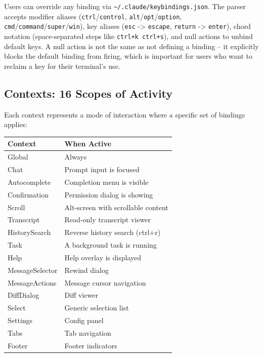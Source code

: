 \documentclass[
  english,
  11pt,
  letterpaper,
]{book}
\begin{document}
Users can override any binding via
\texttt{\textasciitilde{}/.claude/keybindings.json}. The parser accepts
modifier aliases (\texttt{ctrl}/\texttt{control},
\texttt{alt}/\texttt{opt}/\texttt{option},
\texttt{cmd}/\texttt{command}/\texttt{super}/\texttt{win}), key aliases
(\texttt{esc} -\textgreater{} \texttt{escape}, \texttt{return}
-\textgreater{} \texttt{enter}), chord notation (space-separated steps
like \texttt{ctrl+k\ ctrl+s}), and null actions to unbind default keys.
A null action is not the same as not defining a binding -- it explicitly
blocks the default binding from firing, which is important for users who
want to reclaim a key for their terminal's use.

\subsection{Contexts: 16 Scopes of
Activity}\label{contexts-16-scopes-of-activity}

Each context represents a mode of interaction where a specific set of
bindings applies:

\begin{longtable}[]{@{}ll@{}}
\toprule\noalign{}
Context & When Active \\
\midrule\noalign{}
\endhead
\bottomrule\noalign{}
\endlastfoot
Global & Always \\
Chat & Prompt input is focused \\
Autocomplete & Completion menu is visible \\
Confirmation & Permission dialog is showing \\
Scroll & Alt-screen with scrollable content \\
Transcript & Read-only transcript viewer \\
HistorySearch & Reverse history search (ctrl+r) \\
Task & A background task is running \\
Help & Help overlay is displayed \\
MessageSelector & Rewind dialog \\
MessageActions & Message cursor navigation \\
DiffDialog & Diff viewer \\
Select & Generic selection list \\
Settings & Config panel \\
Tabs & Tab navigation \\
Footer & Footer indicators \\
\end{longtable}
\end{document}
